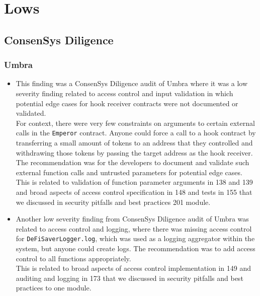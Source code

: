 \section{Lows}\label{lows}

\subsection{ConsenSys Diligence}\label{consensys-diligence}

\subsubsection{Umbra}\label{umbra}

\begin{itemize}
\item
  This finding was a ConsenSys Diligence audit of Umbra where it was a
  low severity finding related to access control and input validation in
  which potential edge cases for hook receiver contracts were not
  documented or validated.\\

  For context, there were very few constraints on arguments to certain
  external calls in the \texttt{Emperor} contract. Anyone could force a
  call to a hook contract by transferring a small amount of tokens to an
  address that they controlled and withdrawing those tokens by passing
  the target address as the hook receiver.\\

  The recommendation was for the developers to document and validate
  such external function calls and untrusted parameters for potential
  edge cases. This is related to validation of function parameter
  arguments in 138 and 139 and broad aspects of access control
  specification in 148 and tests in 155 that we discussed in security
  pitfalls and best practices 201 module.
\item
  Another low severity finding from ConsenSys Diligence audit of Umbra
  was related to access control and logging, where there was missing
  access control for \texttt{DeFiSaverLogger.log}, which was used as a
  logging aggregator within the system, but anyone could create logs.
  The recommendation was to add access control to all functions
  appropriately.\\

  This is related to broad aspects of access control implementation in
  149 and auditing and logging in 173 that we discussed in security
  pitfalls and best practices to one module.
\end{itemize}

